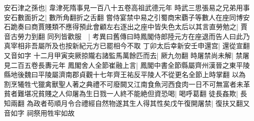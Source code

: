 安石津之孫也|{
	韋津死隋事見一百八十五卷高祖武德元年}
時武三思張易之兄弟用事安石數面折之|{
	數所角翻折之舌翻}
嘗侍宴禁中易之引蜀商宋覇子等數人在座同博安石跪奏曰商賈賤類不應得預此會顧左右逐出之座中皆失色太后以其言直勞勉之|{
	賈音古勞力到翻}
同列皆歡服　|{
	考異曰舊傳曰時鳳閣侍郎陸元方在座退而告人曰此乃真宰相非吾屬所及也按新紀元方已罷相今不取}
丁卯太后幸新安壬申還宫|{
	還從宣翻又音如字}
十二月甲寅突厥掠隴右諸監馬萬餘匹而去|{
	厥九勿翻}
時屠禁尚未解|{
	禁屠見二百五卷長夀元年}
鳳閣舍人全節崔融上言|{
	鳳閣中書全節縣屬齊州漢晉之東平陵縣地後魏曰平陵屬濟南郡貞觀十七年齊王祐反平陵人不從更名全節上時掌翻}
以為割烹犧牲弋獵禽獸聖人著之典禮不可廢闕又江南食魚河西食肉一日不可無富者未革貧者難堪况貧賤之人仰屠為生日戮一人終不能絶但資恐喝|{
	喝呼葛翻}
徒長姦欺|{
	長知兩翻}
為政者苟順月令合禮經自然物遂其生人得其性矣戊午復開屠禁|{
	復扶又翻又音如字}
祠祭用牲牢如故

